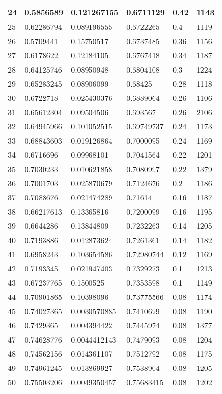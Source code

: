 \begin{longtable}{|l|l|l|l|l|l|}
24 & 0.5856589 & 0.121267155 & 0.6711129 & 0.42 & 1143 \\ \hline 
25 & 0.62286794 & 0.089196555 & 0.6722265 & 0.4 & 1119 \\ \hline 
26 & 0.5709441 & 0.15750517 & 0.6737485 & 0.36 & 1156 \\ \hline 
27 & 0.6178622 & 0.12184105 & 0.6767418 & 0.34 & 1187 \\ \hline 
28 & 0.64125746 & 0.08950948 & 0.6804108 & 0.3 & 1224 \\ \hline 
29 & 0.65283245 & 0.08906099 & 0.68425 & 0.28 & 1118 \\ \hline 
30 & 0.6722718 & 0.025430376 & 0.6889064 & 0.26 & 1106 \\ \hline 
31 & 0.65612304 & 0.09504506 & 0.693567 & 0.26 & 2106 \\ \hline 
32 & 0.64945966 & 0.101052515 & 0.69749737 & 0.24 & 1173 \\ \hline 
33 & 0.68843603 & 0.019126864 & 0.7000095 & 0.24 & 1169 \\ \hline 
34 & 0.6716696 & 0.09968101 & 0.7041564 & 0.22 & 1201 \\ \hline 
35 & 0.7030233 & 0.010621858 & 0.7080997 & 0.22 & 1379 \\ \hline 
36 & 0.7001703 & 0.025870679 & 0.7124676 & 0.2 & 1186 \\ \hline 
37 & 0.7088676 & 0.021474289 & 0.71614 & 0.16 & 1187 \\ \hline 
38 & 0.66217613 & 0.13365816 & 0.7200099 & 0.16 & 1195 \\ \hline 
39 & 0.6644286 & 0.13844809 & 0.7232263 & 0.14 & 1205 \\ \hline 
40 & 0.7193886 & 0.012873624 & 0.7261361 & 0.14 & 1182 \\ \hline 
41 & 0.6958243 & 0.103654586 & 0.72980744 & 0.12 & 1169 \\ \hline 
42 & 0.7193345 & 0.021947403 & 0.7329273 & 0.1 & 1213 \\ \hline 
43 & 0.67237765 & 0.1500525 & 0.7353598 & 0.1 & 1149 \\ \hline 
44 & 0.70901865 & 0.10398096 & 0.73775566 & 0.08 & 1174 \\ \hline 
45 & 0.74027365 & 0.0030570885 & 0.7410629 & 0.08 & 1190 \\ \hline 
46 & 0.7429365 & 0.004394422 & 0.7445974 & 0.08 & 1377 \\ \hline 
47 & 0.74628776 & 0.0044412143 & 0.7479093 & 0.08 & 1204 \\ \hline 
48 & 0.74562156 & 0.014361107 & 0.7512792 & 0.08 & 1175 \\ \hline 
49 & 0.74961245 & 0.013869927 & 0.7538904 & 0.08 & 1205 \\ \hline 
50 & 0.75503206 & 0.0049350457 & 0.75683415 & 0.08 & 1202 \\ \hline 
\end{longtable}
